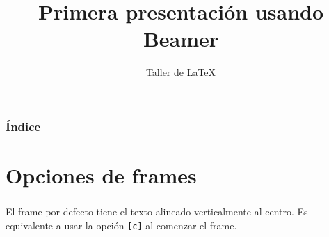 \documentclass[11pt]{beamer}
\title{Primera presentación usando Beamer}
\author{Taller de \LaTeX}
\begin{document}
\frame{\titlepage}

\begin{frame}
	\frametitle{Índice}
	\tableofcontents
\end{frame}

\section{Opciones de frames}
\begin{frame}
	\frametitle{\secname}
	
	El frame por defecto tiene el texto alineado verticalmente al centro. Es equivalente a usar la opción \texttt{[c]} al comenzar el frame.
\end{frame}
\end{document}
